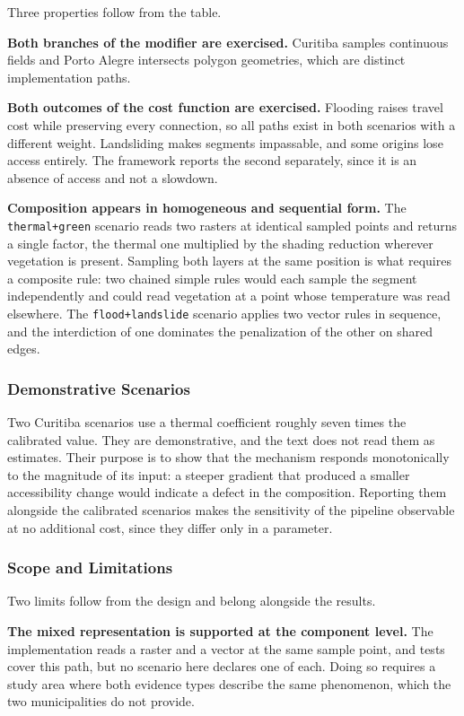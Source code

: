 Three properties follow from the table.

\textbf{Both branches of the modifier are exercised.} Curitiba samples continuous fields and Porto Alegre intersects polygon geometries, which are distinct implementation paths.

\textbf{Both outcomes of the cost function are exercised.} Flooding raises travel cost while preserving every connection, so all paths exist in both scenarios with a different weight. Landsliding makes segments impassable, and some origins lose access entirely. The framework reports the second separately, since it is an absence of access and not a slowdown.

\textbf{Composition appears in homogeneous and sequential form.} The \texttt{thermal+green} scenario reads two rasters at identical sampled points and returns a single factor, the thermal one multiplied by the shading reduction wherever vegetation is present. Sampling both layers at the same position is what requires a composite rule: two chained simple rules would each sample the segment independently and could read vegetation at a point whose temperature was read elsewhere. The \texttt{flood+landslide} scenario applies two vector rules in sequence, and the interdiction of one dominates the penalization of the other on shared edges.

\subsubsection{Demonstrative Scenarios}

Two Curitiba scenarios use a thermal coefficient roughly seven times the calibrated value. They are demonstrative, and the text does not read them as estimates. Their purpose is to show that the mechanism responds monotonically to the magnitude of its input: a steeper gradient that produced a smaller accessibility change would indicate a defect in the composition. Reporting them alongside the calibrated scenarios makes the sensitivity of the pipeline observable at no additional cost, since they differ only in a parameter.
\subsubsection{Scope and Limitations}

Two limits follow from the design and belong alongside the results.

\textbf{The mixed representation is supported at the component level.} The implementation reads a raster and a vector at the same sample point, and tests cover this path, but no scenario here declares one of each. Doing so requires a study area where both evidence types describe the same phenomenon, which the two municipalities do not provide.

